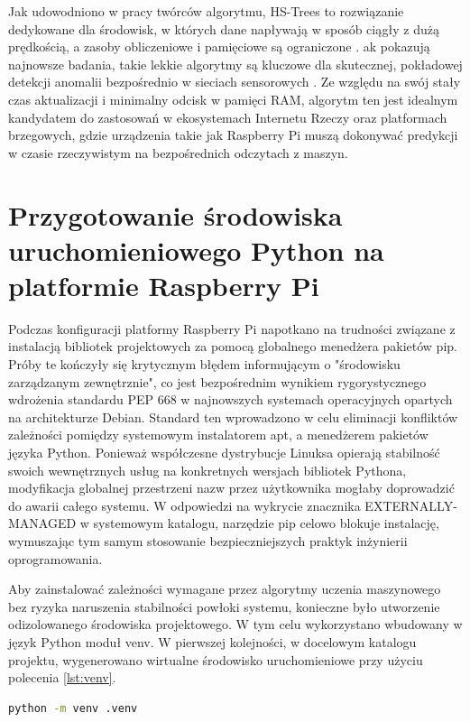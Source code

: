 \documentclass[12pt,twoside]{article}
\begin{document}
Jak udowodniono w pracy twórców algorytmu, HS-Trees to rozwiązanie dedykowane dla środowisk, w których dane napływają w sposób ciągły z dużą prędkością, a zasoby obliczeniowe i pamięciowe są ograniczone \cite{fastanomalydetection}. ak pokazują najnowsze badania, takie lekkie algorytmy są kluczowe dla skutecznej, pokładowej detekcji anomalii bezpośrednio w sieciach sensorowych \cite{reis2025edge}. Ze względu na swój stały czas aktualizacji i minimalny odcisk w pamięci RAM, algorytm ten jest idealnym kandydatem do zastosowań w ekosystemach Internetu Rzeczy oraz platformach brzegowych, gdzie urządzenia takie jak Raspberry Pi muszą dokonywać predykcji w czasie rzeczywistym na bezpośrednich odczytach z maszyn.

\section{Przygotowanie środowiska uruchomieniowego Python na platformie Raspberry Pi}
Podczas konfiguracji platformy Raspberry Pi napotkano na trudności związane z instalacją bibliotek projektowych za pomocą globalnego menedżera pakietów pip. Próby te kończyły się krytycznym błędem informującym o "środowisku zarządzanym zewnętrznie", co jest bezpośrednim wynikiem rygorystycznego wdrożenia standardu PEP 668 w najnowszych systemach operacyjnych opartych na architekturze Debian. Standard ten wprowadzono w celu eliminacji konfliktów zależności pomiędzy systemowym instalatorem apt, a menedżerem pakietów języka Python. Ponieważ współczesne dystrybucje Linuksa opierają stabilność swoich wewnętrznych usług na konkretnych wersjach bibliotek Pythona, modyfikacja globalnej przestrzeni nazw przez użytkownika mogłaby doprowadzić do awarii całego systemu. W odpowiedzi na wykrycie znacznika EXTERNALLY-MANAGED w systemowym katalogu, narzędzie pip celowo blokuje instalację, wymuszając tym samym stosowanie bezpieczniejszych praktyk inżynierii oprogramowania.

Aby zainstalować zależności wymagane przez algorytmy uczenia maszynowego bez ryzyka naruszenia stabilności powłoki systemu, konieczne było utworzenie odizolowanego środowiska projektowego. W tym celu wykorzystano wbudowany w język Python moduł venv. W pierwszej kolejności, w docelowym katalogu projektu, wygenerowano wirtualne środowisko uruchomieniowe przy użyciu polecenia \ref{lst:venv}.

\begin{lstlisting}[language=bash, numbers=none, caption={Inicjalizacja środowiska venv}, label={lst:venv}]
python -m venv .venv
\end{lstlisting}
\end{document}
